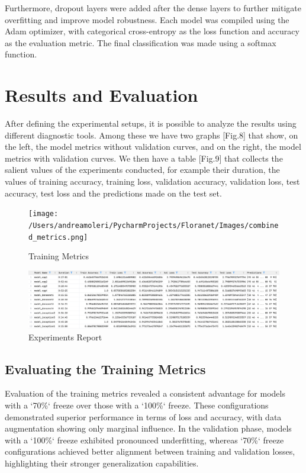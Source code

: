 Furthermore, dropout layers were added after the dense layers to further mitigate overfitting and improve model
robustness. Each model was compiled using the Adam optimizer, with categorical cross-entropy as the loss function and
accuracy as the evaluation metric. The final classification was made using a softmax function.


\section{Results and Evaluation}

After defining the experimental setups, it is possible to analyze the results using different diagnostic tools.
Among these we have two graphs [Fig.8] that show, on the left, the model metrics without validation curves, and on
the right, the model metrics with validation curves. We then have a table [Fig.9] that collects the salient values
of the experiments conducted, for example their duration, the values ​​of training accuracy, training loss,
validation accuracy, validation loss, test accuracy, test loss and the predictions made on the test set.

\begin{figure}[h!]
    \centering
    \texttt{[image: /Users/andreamoleri/PycharmProjects/Floranet/Images/combined\_metrics.png]}
    \caption{Training Metrics}
\end{figure}

\begin{figure}[h!]
    \centering
    \includegraphics[width=\linewidth]{Images/Report}
    \caption{Experiments Report}
\end{figure}

\subsection{Evaluating the Training Metrics}

Evaluation of the training metrics revealed a consistent advantage for models with a `70\%` freeze over those with a
`100\%` freeze. These configurations demonstrated superior performance in terms of loss and accuracy, with data
augmentation showing only marginal influence. In the validation phase, models with a `100\%` freeze exhibited pronounced
underfitting, whereas `70\%` freeze configurations achieved better alignment between training and validation losses,
highlighting their stronger generalization capabilities.

